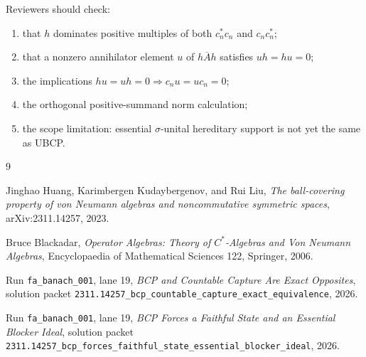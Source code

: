 \documentclass[11pt]{article}
\begin{document}
Reviewers should check:
\begin{enumerate}
    \item that \(h\) dominates positive multiples of both \(c_n^*c_n\) and
          \(c_nc_n^*\);
    \item that a nonzero annihilator element \(u\) of \(\overline{hAh}\)
          satisfies \(uh=hu=0\);
    \item the implications \(hu=uh=0\Rightarrow c_nu=uc_n=0\);
    \item the orthogonal positive-summand norm calculation;
    \item the scope limitation: essential \(\sigma\)-unital hereditary support
          is not yet the same as UBCP.
\end{enumerate}

\begin{thebibliography}{9}

Jinghao Huang, Karimbergen Kudaybergenov, and Rui Liu,
\emph{The ball-covering property of von Neumann algebras and noncommutative
symmetric spaces}, arXiv:2311.14257, 2023.

Bruce Blackadar,
\emph{Operator Algebras: Theory of \(C^*\)-Algebras and Von Neumann
Algebras},
Encyclopaedia of Mathematical Sciences 122, Springer, 2006.

Run \texttt{fa\_banach\_001}, lane 19,
\emph{BCP and Countable Capture Are Exact Opposites},
solution packet
\texttt{2311.14257\_bcp\_countable\_capture\_exact\_equivalence}, 2026.

Run \texttt{fa\_banach\_001}, lane 19,
\emph{BCP Forces a Faithful State and an Essential Blocker Ideal},
solution packet
\texttt{2311.14257\_bcp\_forces\_faithful\_state\_essential\_blocker\_ideal},
2026.

\end{thebibliography}
\end{document}
